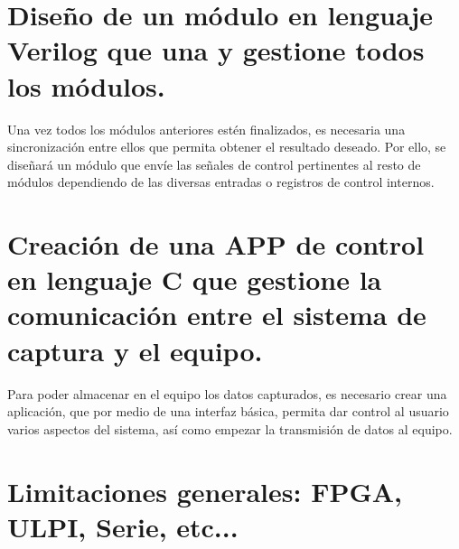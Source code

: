 \section{Diseño de un módulo en lenguaje Verilog que una y gestione todos los módulos.}
Una vez todos los módulos anteriores estén finalizados, es necesaria una sincronización entre ellos que permita obtener el resultado deseado. Por ello, se diseñará un módulo que envíe las señales de control pertinentes al resto de módulos dependiendo de las diversas entradas o registros de control internos.

\section{Creación de una APP de control en lenguaje C que gestione la comunicación entre el sistema de captura y el equipo.}
Para poder almacenar en el equipo los datos capturados, es necesario crear una aplicación, que por medio de una interfaz básica, permita dar control al usuario varios aspectos del sistema, así como empezar la transmisión de datos al equipo.

\section{Limitaciones generales: FPGA, ULPI, Serie, etc...}







